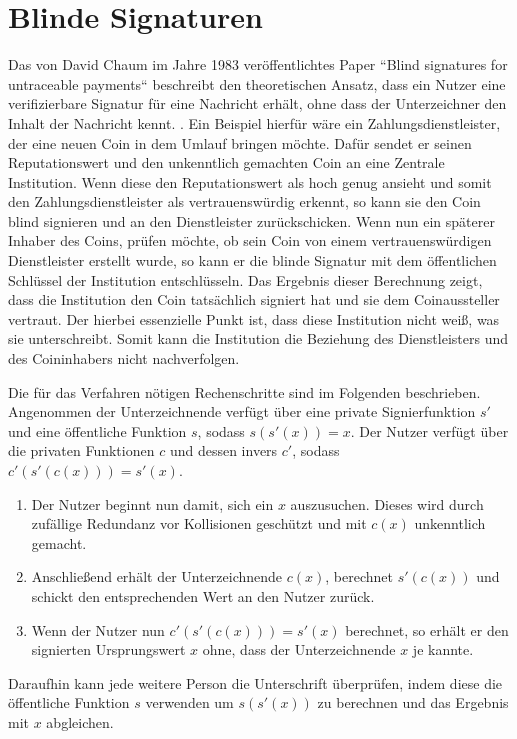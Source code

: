 \documentclass{scrreprt}
\begin{document}
\section{Blinde Signaturen}
\label{sec:blindSig}
Das von David Chaum im Jahre 1983 veröffentlichtes Paper ``Blind signatures for untraceable payments`` beschreibt den theoretischen Ansatz, dass ein Nutzer eine verifizierbare Signatur für eine Nachricht erhält, ohne dass der Unterzeichner den Inhalt der Nachricht kennt. \cite{chaum1983blind}. Ein Beispiel hierfür wäre ein Zahlungsdienstleister, der eine neuen Coin in dem Umlauf bringen möchte. Dafür sendet er seinen Reputationswert und den unkenntlich gemachten Coin an eine Zentrale Institution. Wenn diese den Reputationswert als hoch genug ansieht und somit den Zahlungsdienstleister als vertrauenswürdig erkennt, so kann sie den Coin blind signieren und an den Dienstleister zurückschicken. Wenn nun ein späterer Inhaber des Coins, prüfen möchte, ob sein Coin von einem vertrauenswürdigen Dienstleister erstellt wurde, so kann er die blinde Signatur mit dem öffentlichen Schlüssel der Institution entschlüsseln. Das Ergebnis dieser Berechnung zeigt, dass die Institution den Coin tatsächlich signiert hat und sie dem Coinaussteller vertraut. Der hierbei essenzielle Punkt ist, dass diese Institution nicht weiß, was sie unterschreibt. Somit kann die Institution die Beziehung des Dienstleisters und des Coininhabers nicht nachverfolgen. 

Die für das Verfahren nötigen Rechenschritte sind im Folgenden beschrieben. Angenommen der Unterzeichnende verfügt über eine private Signierfunktion $s'$ und eine öffentliche Funktion $s$, sodass $s(s'(x)) = x$. Der Nutzer verfügt über die privaten Funktionen $c$ und dessen invers $c'$, sodass $c'(s'(c(x))) = s'(x)$. 
\begin{enumerate}
    \item Der Nutzer beginnt nun damit, sich ein $x$ auszusuchen. Dieses wird durch zufällige Redundanz vor Kollisionen geschützt und mit $c(x)$ unkenntlich gemacht.
    \item Anschließend erhält der Unterzeichnende $c(x)$, berechnet $s'(c(x))$ und schickt den entsprechenden Wert an den Nutzer zurück.
    \item Wenn der Nutzer nun $c'(s'(c(x))) = s'(x)$ berechnet, so erhält er den signierten Ursprungswert $x$ ohne, dass der Unterzeichnende $x$ je kannte.
\end{enumerate}
Daraufhin kann jede weitere Person die Unterschrift überprüfen, indem diese die öffentliche Funktion $s$ verwenden um $s(s'(x))$ zu berechnen und das Ergebnis mit $x$ abgleichen. 
\end{document}
